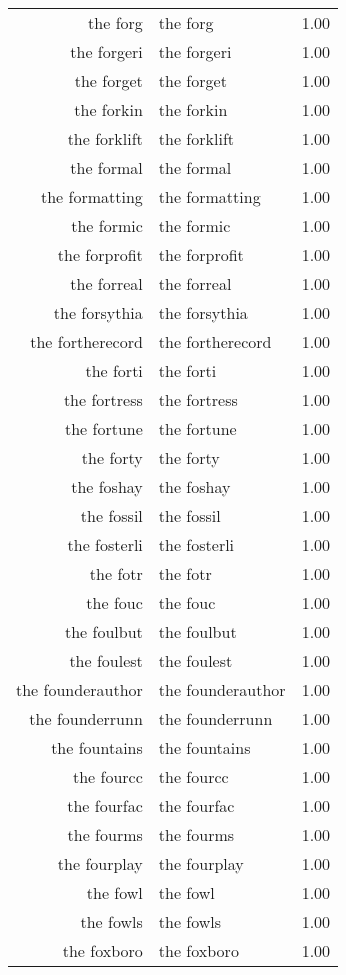 \begin{table}[ht]
\begin{tabular}{rlr}
  the forg & the forg & 1.00 \\ 
  the forgeri & the forgeri & 1.00 \\ 
  the forget & the forget & 1.00 \\ 
  the forkin & the forkin & 1.00 \\ 
  the forklift & the forklift & 1.00 \\ 
  the formal & the formal & 1.00 \\ 
  the formatting & the formatting & 1.00 \\ 
  the formic & the formic & 1.00 \\ 
  the forprofit & the forprofit & 1.00 \\ 
  the forreal & the forreal & 1.00 \\ 
  the forsythia & the forsythia & 1.00 \\ 
  the fortherecord & the fortherecord & 1.00 \\ 
  the forti & the forti & 1.00 \\ 
  the fortress & the fortress & 1.00 \\ 
  the fortune & the fortune & 1.00 \\ 
  the forty & the forty & 1.00 \\ 
  the foshay & the foshay & 1.00 \\ 
  the fossil & the fossil & 1.00 \\ 
  the fosterli & the fosterli & 1.00 \\ 
  the fotr & the fotr & 1.00 \\ 
  the fouc & the fouc & 1.00 \\ 
  the foulbut & the foulbut & 1.00 \\ 
  the foulest & the foulest & 1.00 \\ 
  the founderauthor & the founderauthor & 1.00 \\ 
  the founderrunn & the founderrunn & 1.00 \\ 
  the fountains & the fountains & 1.00 \\ 
  the fourcc & the fourcc & 1.00 \\ 
  the fourfac & the fourfac & 1.00 \\ 
  the fourms & the fourms & 1.00 \\ 
  the fourplay & the fourplay & 1.00 \\ 
  the fowl & the fowl & 1.00 \\ 
  the fowls & the fowls & 1.00 \\ 
  the foxboro & the foxboro & 1.00 \\ 

\end{tabular}
\end{table}
